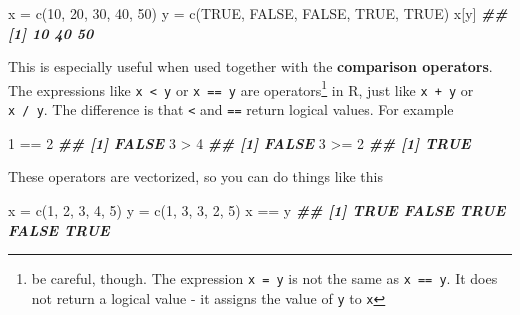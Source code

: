 \documentclass[
]{book}
\newenvironment{Shaded}{\begin{snugshade}}{\end{snugshade}}
\newcommand{\ConstantTok}[1]{\textcolor[rgb]{0.00,0.00,0.00}{#1}}
\newcommand{\DecValTok}[1]{\textcolor[rgb]{0.00,0.00,0.81}{#1}}
\newcommand{\DocumentationTok}[1]{\textcolor[rgb]{0.56,0.35,0.01}{\textbf{\textit{#1}}}}
\newcommand{\FunctionTok}[1]{\textcolor[rgb]{0.00,0.00,0.00}{#1}}
\newcommand{\NormalTok}[1]{#1}
\newcommand{\OtherTok}[1]{\textcolor[rgb]{0.56,0.35,0.01}{#1}}
\newcommand{\SpecialCharTok}[1]{\textcolor[rgb]{0.00,0.00,0.00}{#1}}
\theoremstyle{definition}
\theoremstyle{definition}
\theoremstyle{definition}
\theoremstyle{definition}
\theoremstyle{remark}
\begin{document}
\begin{Shaded}
\begin{Highlighting}[]
\NormalTok{x }\OtherTok{=} \FunctionTok{c}\NormalTok{(}\DecValTok{10}\NormalTok{, }\DecValTok{20}\NormalTok{, }\DecValTok{30}\NormalTok{, }\DecValTok{40}\NormalTok{, }\DecValTok{50}\NormalTok{)}
\NormalTok{y }\OtherTok{=} \FunctionTok{c}\NormalTok{(}\ConstantTok{TRUE}\NormalTok{, }\ConstantTok{FALSE}\NormalTok{, }\ConstantTok{FALSE}\NormalTok{, }\ConstantTok{TRUE}\NormalTok{, }\ConstantTok{TRUE}\NormalTok{)}
\NormalTok{x[y]}
\DocumentationTok{\#\# [1] 10 40 50}
\end{Highlighting}
\end{Shaded}

This is especially useful when used together with the \textbf{comparison operators}. The expressions like \texttt{x\ \textless{}\ y} or \texttt{x\ ==\ y} are operators\footnote{be careful, though. The expression \texttt{x\ =\ y} is not the same as \texttt{x\ ==\ y}. It does not return a logical value - it assigns the value of \texttt{y} to \texttt{x}} in R, just like \texttt{x\ +\ y} or \texttt{x\ /\ y}. The difference is that \texttt{\textless{}} and \texttt{==} return logical values. For example

\begin{Shaded}
\begin{Highlighting}[]
\DecValTok{1} \SpecialCharTok{==} \DecValTok{2}
\DocumentationTok{\#\# [1] FALSE}
\DecValTok{3} \SpecialCharTok{\textgreater{}} \DecValTok{4}
\DocumentationTok{\#\# [1] FALSE}
\DecValTok{3} \SpecialCharTok{\textgreater{}=} \DecValTok{2}
\DocumentationTok{\#\# [1] TRUE}
\end{Highlighting}
\end{Shaded}

These operators are vectorized, so you can do things like this

\begin{Shaded}
\begin{Highlighting}[]
\NormalTok{x }\OtherTok{=} \FunctionTok{c}\NormalTok{(}\DecValTok{1}\NormalTok{, }\DecValTok{2}\NormalTok{, }\DecValTok{3}\NormalTok{, }\DecValTok{4}\NormalTok{, }\DecValTok{5}\NormalTok{)}
\NormalTok{y }\OtherTok{=} \FunctionTok{c}\NormalTok{(}\DecValTok{1}\NormalTok{, }\DecValTok{3}\NormalTok{, }\DecValTok{3}\NormalTok{, }\DecValTok{2}\NormalTok{, }\DecValTok{5}\NormalTok{)}
\NormalTok{x }\SpecialCharTok{==}\NormalTok{ y}
\DocumentationTok{\#\# [1]  TRUE FALSE  TRUE FALSE  TRUE}
\end{Highlighting}
\end{Shaded}
\end{document}
